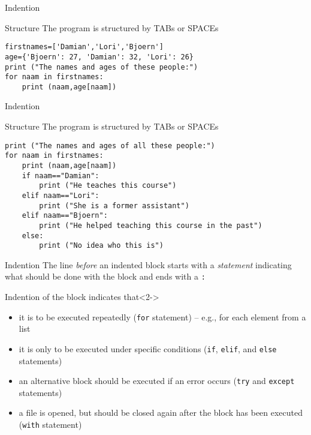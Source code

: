 \documentclass{beamer}
\begin{document}
\begin{frame}[fragile]{Indention}
\begin{block}{Structure}
The program is structured by TABs or SPACEs
\end{block}
\begin{lstlisting}
firstnames=['Damian','Lori','Bjoern']
age={'Bjoern': 27, 'Damian': 32, 'Lori': 26}
print ("The names and ages of these people:")
for naam in firstnames:
    print (naam,age[naam])
\end{lstlisting}
\end{frame}





\begin{frame}[fragile]{Indention}
\begin{block}{Structure}
The program is structured by TABs or SPACEs
\end{block}
\begin{lstlisting}
print ("The names and ages of all these people:")
for naam in firstnames:
    print (naam,age[naam])
    if naam=="Damian":
        print ("He teaches this course")
    elif naam=="Lori":
        print ("She is a former assistant")
    elif naam=="Bjoern":
        print ("He helped teaching this course in the past")
    else:
        print ("No idea who this is")
\end{lstlisting}
\end{frame}


\begin{frame}{Indention}
The line \emph{before} an indented block starts with a \emph{statement} indicating what should be done with the block and ends with a \texttt{:}

\begin{block}{Indention of the block indicates that}<2->
\begin{itemize}
\item<3-> it is to be executed repeatedly (\texttt{for} statement) – e.g., for each element from a list
\item<4-> it is only to be executed under specific conditions (\texttt{if}, \texttt{elif}, and \texttt{else} statements)
\item<5-> an alternative block should be executed if an error occurs (\texttt{try} and \texttt{except} statements)
\item<6-> a file is opened, but should be closed again after the block has been executed (\texttt{with} statement)
\end{itemize}
\end{block}
\end{frame}
\end{document}

